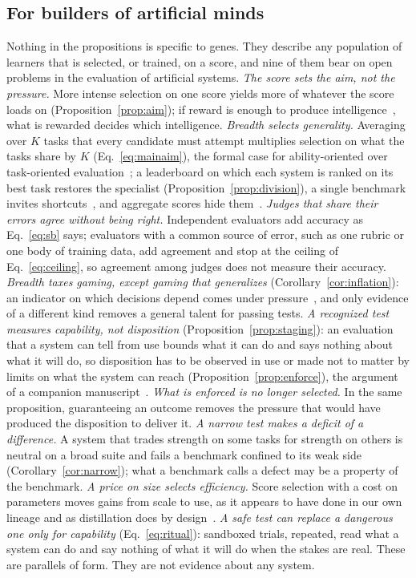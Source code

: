 \subsection{For builders of artificial minds}\label{sec:ai}

Nothing in the propositions is specific to genes. They describe any population of learners that is selected, or trained,
on a score, and nine of them bear on open problems in the evaluation of artificial systems. \emph{The score sets the aim,
not the pressure.} More intense selection on one score yields more of whatever the score loads on
(Proposition~\ref{prop:aim}); if reward is enough to produce intelligence~\cite{silver2021}, what is rewarded decides which
intelligence. \emph{Breadth selects generality.} Averaging over $K$ tasks that every candidate must attempt multiplies
selection on what the tasks share by $K$ (Eq.~\ref{eq:mainaim}), the formal case for ability-oriented over task-oriented
evaluation~\cite{hernandezorallo2017,legg2007}; a leaderboard on which each system is ranked on its best task restores the
specialist (Proposition~\ref{prop:division}), a single benchmark invites shortcuts~\cite{geirhos2020}, and aggregate scores
hide them~\cite{burnell2023}. \emph{Judges that share their errors agree without being right.} Independent evaluators add
accuracy as Eq.~\eqref{eq:sb} says; evaluators with a common source of error, such as one rubric or one body of training
data, add agreement and stop at the ceiling of Eq.~\eqref{eq:ceiling}, so agreement among judges does not measure their
accuracy. \emph{Breadth taxes gaming, except gaming that generalizes} (Corollary~\ref{cor:inflation}):
an indicator on which decisions depend comes under pressure~\cite{campbell1979}, and only evidence of a different kind
removes a general talent for passing tests. \emph{A recognized test measures capability, not disposition}
(Proposition~\ref{prop:staging}): an evaluation that a system can tell from use bounds what it can do and says nothing
about what it will do, so disposition has to be observed in use or made not to matter by limits on what the system can
reach (Proposition~\ref{prop:enforce}), the argument of a companion manuscript~\cite{taylor2026iina}. \emph{What is enforced
is no longer selected.} In the same proposition, guaranteeing an outcome removes the pressure that would have produced the
disposition to deliver it. \emph{A narrow test makes a deficit of a difference.} A system that trades strength on some
tasks for strength on others is neutral on a broad suite and fails a benchmark confined to its weak side
(Corollary~\ref{cor:narrow}); what a benchmark calls a defect may be a property of the benchmark. \emph{A price on size
selects efficiency.} Score selection with a cost on parameters moves gains from scale to use, as it appears to have done
in our own lineage and as distillation does by design~\cite{hinton2015}. \emph{A safe test can replace a dangerous one
only for capability} (Eq.~\ref{eq:ritual}): sandboxed trials, repeated, read what a system can do and say nothing of what
it will do when the stakes are real. These are parallels of form. They are not evidence about any system.


